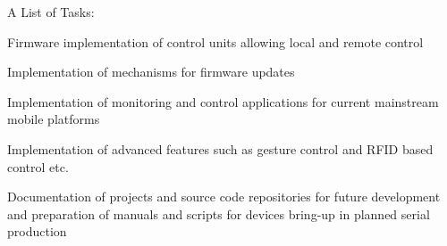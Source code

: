      
    \begin{titleitemize}{A List of Tasks:}
        \item Firmware implementation of control units allowing local and remote control
        \item Implementation of mechanisms for firmware updates
        \item Implementation of monitoring and control applications for current mainstream mobile platforms
        \item Implementation of advanced features such as gesture control and  RFID based control etc.
        \item Documentation of projects and source code repositories for future development and preparation of manuals and scripts for devices bring-up in planned serial production
    \end{titleitemize}
 


    
    
  